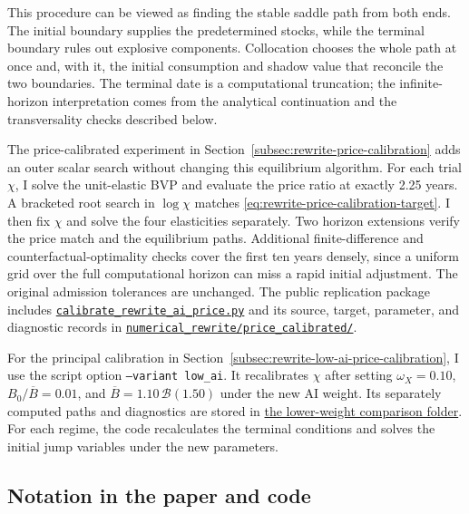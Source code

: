 This procedure can be viewed as finding the stable saddle path from both ends.
The initial boundary supplies the predetermined stocks, while the terminal
boundary rules out explosive components. Collocation chooses the whole path at
once and, with it, the initial consumption and shadow value that reconcile the
two boundaries. The terminal date is a computational truncation; the
infinite-horizon interpretation comes from the analytical continuation and
the transversality checks described below.

The price-calibrated experiment in
Section~\ref{subsec:rewrite-price-calibration} adds an outer scalar search
without changing this equilibrium algorithm. For each trial $\chi$, I solve
the unit-elastic BVP and evaluate the price ratio at exactly 2.25 years.
A bracketed root search in $\log\chi$ matches
\eqref{eq:rewrite-price-calibration-target}. I then fix $\chi$ and solve
the four elasticities separately. Two horizon extensions verify the price
match and the equilibrium paths. Additional finite-difference and
counterfactual-optimality checks cover the first ten years densely, since a
uniform grid over the full computational horizon can miss a rapid initial
adjustment. The original admission tolerances are unchanged. The public
replication package includes
\href{https://github.com/oliverpardo1979/AI-Future-Paper-WTF/blob/main/scripts/calibrate_rewrite_ai_price.py}
{\texttt{calibrate\_rewrite\_ai\_price.py}} and its source, target,
parameter, and diagnostic records in
\href{https://github.com/oliverpardo1979/AI-Future-Paper-WTF/tree/main/numerical_rewrite/price_calibrated}
{\texttt{numerical\_rewrite/price\_calibrated/}}.

For the principal calibration in Section~\ref{subsec:rewrite-low-ai-price-calibration},
I use the script option \texttt{--variant low\_ai}.
It recalibrates $\chi$ after setting $\omega_X=0.10$,
$B_0/\overline B=0.01$, and $\overline B=1.10\,\mathcal B(1.50)$ under
the new AI weight. Its separately computed paths and diagnostics are stored in
\href{https://github.com/oliverpardo1979/AI-Future-Paper-WTF/tree/main/numerical_rewrite/price_calibrated_low_ai_high_cap}
{the lower-weight comparison folder}. For each regime, the code recalculates
the terminal conditions and solves the initial jump variables under the new
parameters.

\subsection{Notation in the paper and code}

